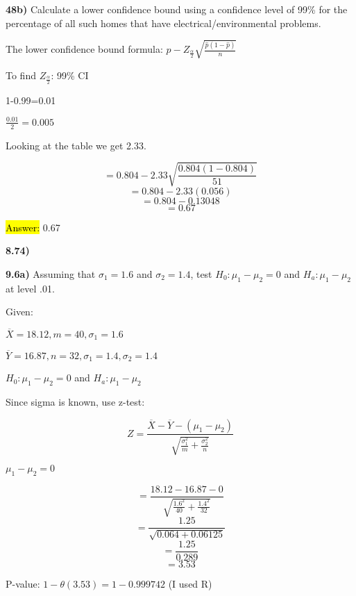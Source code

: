 \documentclass{article}
\begin{document}
\textbf{48b)} Calculate a lower confidence bound using a confidence level of 99\% for the percentage of all such homes that have electrical/environmental problems.

The lower confidence bound formula: $\hat{p}-Z_{\frac{\alpha}{2}}\sqrt{\frac{\hat{p}(1-\hat{p})}{n}}$

\vspace{2mm}

To find $Z_{\frac{\alpha}{2}}$: 99\% CI

\vspace{2mm}

1-0.99=0.01

\vspace{2mm}

$\frac{0.01}{2}=0.005$

\vspace{2mm}

Looking at the table we get 2.33.

\vspace{2mm}

$$=0.804-2.33\sqrt{\frac{0.804(1-0.804)}{51}}$$
$$=0.804-2.33(0.056)$$
$$=0.804-0.13048$$
$$=0.67$$

\vspace{2mm}

\hl{Answer:} 0.67



\newpage
\textbf{8.74)}


\newpage
\textbf{9.6a)} Assuming that $\sigma_{1}=1.6$ and $\sigma_{2}=1.4$, test $H_{0}: \mu_{1}-\mu_{2}=0$ and $H_{a}: \mu_{1}-\mu_{2}$ at level .01.

Given: 

$\overline{X}=18.12, m=40, \sigma_{1}=1.6$ 


$\overline{Y}=16.87, n=32, \sigma_{1}=1.4, \sigma_{2}=1.4$ 

$H_{0}: \mu_{1}-\mu_{2}=0$ and $H_{a}: \mu_{1}-\mu_{2}$ 

Since sigma is known, use z-test:

$$Z=\frac{\overline{X}-\overline{Y}-(\mu_{1}-\mu_{2})}{\sqrt{\frac{\sigma^{2}_{1}}{m}+\frac{\sigma^{2}_{2}}{n}}}$$

 $\mu_{1}-\mu_{2}=0$

$$=\frac{18.12-16.87-0}{\sqrt{\frac{1.6^{2}}{40}+\frac{1.4^{2}}{32}}}$$
$$=\frac{1.25}{\sqrt{0.064+0.06125}}$$
$$=\frac{1.25}{0.289}$$
$$=3.53$$

P-value:
 $1-\theta(3.53)=1-0.999742$ (I used R)
 
\end{document}

